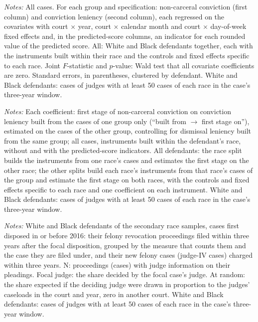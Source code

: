\documentclass[11pt]{article}
\newcommand{\tabnote}[1]{\par\vspace{0.6ex}\begin{minipage}{\linewidth}\linespread{1}\footnotesize\textit{Notes:} #1\end{minipage}}
\newcommand{\racesamplenote}{White and Black defendants: cases of judges with at least 50 cases of each race in the case's three-year window.}
\newcommand{\allnote}{All: White and Black defendants together, each with the instruments built within their race and the controls and fixed effects specific to each race.}
\begin{document}
\begin{table}[H]
\centering
\caption{Balance: non-carceral conviction and conviction leniency, secondary analysis}\label{tab:balance_secondary}
\resizebox{\textwidth}{!}{}
\tabnote{All cases. For each group and specification: non-carceral conviction (first column) and conviction leniency (second column), each regressed on the covariates with court $\times$ year, court $\times$ calendar month and court $\times$ day-of-week fixed effects and, in the predicted-score columns, an indicator for each rounded value of the predicted score. \allnote{} Joint $F$-statistic and $p$-value: Wald test that all covariate coefficients are zero. Standard errors, in parentheses, clustered by defendant. \racesamplenote}
\end{table}

\begin{table}[H]
\centering
\caption{Split-sample monotonicity: first stages, secondary analysis}\label{tab:mono_secondary}
\resizebox{\textwidth}{!}{}
\tabnote{Each coefficient: first stage of non-carceral conviction on conviction leniency built from the cases of one group only (``built from $\rightarrow$ first stage on''), estimated on the cases of the other group, controlling for dismissal leniency built from the same group; all cases, instruments built within the defendant's race, without and with the predicted-score indicators. All defendants: the race split builds the instruments from one race's cases and estimates the first stage on the other race; the other splits build each race's instruments from that race's cases of the group and estimate the first stage on both races, with the controls and fixed effects specific to each race and one coefficient on each instrument. \racesamplenote}
\end{table}

\begin{table}[H]
\centering
\caption{Who decides the defendants' revocation proceedings and new felony cases, secondary analysis}\label{tab:rev_judges_sec}
{\small\setlength{\tabcolsep}{4pt}\renewcommand{\arraystretch}{0.9}\resizebox{\textwidth}{!}{}}
\tabnote{White and Black defendants of the secondary race samples, cases first disposed in or before 2016: their felony revocation proceedings filed within three years after the focal disposition, grouped by the measure that counts them and the case they are filed under, and their new felony cases (judge-IV cases) charged within three years. N: proceedings (cases) with judge information on their pleadings. Focal judge: the share decided by the focal case's judge. At random: the share expected if the deciding judge were drawn in proportion to the judges' caseloads in the court and year, zero in another court. \racesamplenote}
\end{table}
\end{document}
